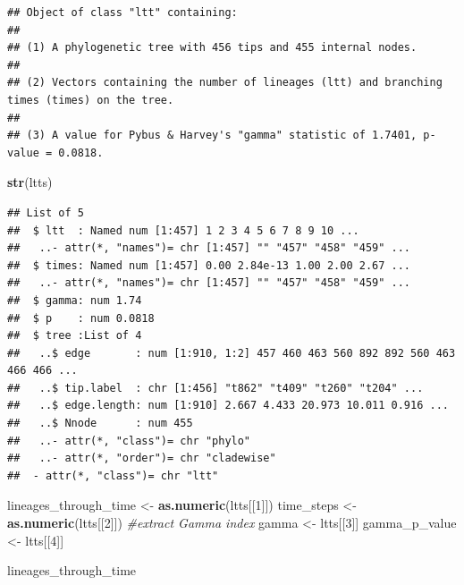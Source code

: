 \documentclass[]{book}
\newenvironment{Shaded}{\begin{snugshade}}{\end{snugshade}}
\newcommand{\KeywordTok}[1]{\textcolor[rgb]{0.13,0.29,0.53}{\textbf{{#1}}}}
\newcommand{\DecValTok}[1]{\textcolor[rgb]{0.00,0.00,0.81}{{#1}}}
\newcommand{\StringTok}[1]{\textcolor[rgb]{0.31,0.60,0.02}{{#1}}}
\newcommand{\CommentTok}[1]{\textcolor[rgb]{0.56,0.35,0.01}{\textit{{#1}}}}
\newcommand{\NormalTok}[1]{{#1}}
\theoremstyle{definition}
\theoremstyle{definition}
\theoremstyle{remark}
\begin{document}
\begin{verbatim}
## Object of class "ltt" containing:
## 
## (1) A phylogenetic tree with 456 tips and 455 internal nodes.
## 
## (2) Vectors containing the number of lineages (ltt) and branching times (times) on the tree.
## 
## (3) A value for Pybus & Harvey's "gamma" statistic of 1.7401, p-value = 0.0818.
\end{verbatim}

\begin{Shaded}
\begin{Highlighting}[]
\KeywordTok{str}\NormalTok{(ltts)}
\end{Highlighting}
\end{Shaded}

\begin{verbatim}
## List of 5
##  $ ltt  : Named num [1:457] 1 2 3 4 5 6 7 8 9 10 ...
##   ..- attr(*, "names")= chr [1:457] "" "457" "458" "459" ...
##  $ times: Named num [1:457] 0.00 2.84e-13 1.00 2.00 2.67 ...
##   ..- attr(*, "names")= chr [1:457] "" "457" "458" "459" ...
##  $ gamma: num 1.74
##  $ p    : num 0.0818
##  $ tree :List of 4
##   ..$ edge       : num [1:910, 1:2] 457 460 463 560 892 892 560 463 466 466 ...
##   ..$ tip.label  : chr [1:456] "t862" "t409" "t260" "t204" ...
##   ..$ edge.length: num [1:910] 2.667 4.433 20.973 10.011 0.916 ...
##   ..$ Nnode      : num 455
##   ..- attr(*, "class")= chr "phylo"
##   ..- attr(*, "order")= chr "cladewise"
##  - attr(*, "class")= chr "ltt"
\end{verbatim}

\begin{Shaded}
\begin{Highlighting}[]
\NormalTok{lineages_through_time <-}\StringTok{ }\KeywordTok{as.numeric}\NormalTok{(ltts[[}\DecValTok{1}\NormalTok{]])}
\NormalTok{time_steps <-}\StringTok{ }\KeywordTok{as.numeric}\NormalTok{(ltts[[}\DecValTok{2}\NormalTok{]])}
\CommentTok{#extract Gamma index}
\NormalTok{gamma <-}\StringTok{ }\NormalTok{ltts[[}\DecValTok{3}\NormalTok{]]}
\NormalTok{gamma_p_value <-}\StringTok{ }\NormalTok{ltts[[}\DecValTok{4}\NormalTok{]]}
\end{Highlighting}
\end{Shaded}

\begin{Shaded}
\begin{Highlighting}[]
\NormalTok{lineages_through_time }
\end{Highlighting}
\end{Shaded}
\end{document}
